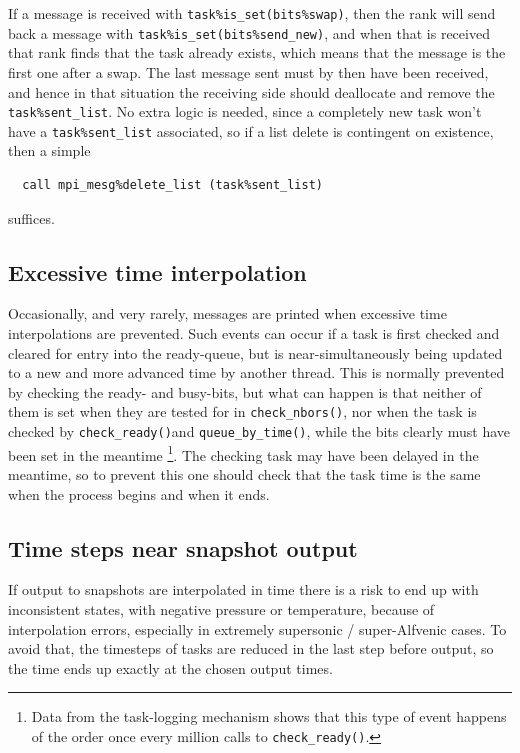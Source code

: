 \documentclass[paper=a4,fontsize=11pt]{scrartcl}
\numberwithin{equation}{section}		%
\numberwithin{figure}{section}			%
\numberwithin{table}{section}				%
\newcommand{\codecolor}{\color{Blue}}
\newcommand{\Code}[1]{{\codecolor\texttt{#1}}}
\def\checkready{\Code{check\_ready()}}
\def\checknbors{\Code{check\_nbors()}}
\def\queuebytime{\Code{queue\_by\_time()}}
\begin{document}
If a message is received with \Code{task\%is\_set(bits\%swap)}, then the rank will send back a message with \Code{task\%is\_set(bits\%send\_new)}, and when that is received that rank finds that the task already exists, which means that the message is the first one after a swap.  The last message sent must by then have been received, and hence in that situation the receiving side should deallocate and remove the \Code{task\%sent\_list}.  No extra logic is needed, since a completely new task won't have a \Code{task\%sent\_list} associated, so if a list delete is contingent on existence, then a simple 
{\codecolor\begin{verbatim}
  call mpi_mesg%delete_list (task%sent_list)
\end{verbatim}}
suffices.

\subsection{Excessive time interpolation}
Occasionally, and very rarely, messages are printed when excessive time interpolations are prevented.  Such events can occur if a task is first checked and cleared for entry into the ready-queue, but is near-simultaneously being updated to a new and more advanced time by another thread.  This is normally prevented by checking the ready- and busy-bits, but what can happen is that neither of them is set when they are tested for in \checknbors, nor when the task is checked by \checkready and \queuebytime{}, while the bits clearly must have been set in the meantime \footnote{Data from the task-logging mechanism shows that this type of event happens of the order once every million calls to \checkready.}.
The checking task may have been delayed in the meantime, so to prevent this one should check that the task time is the same when the process begins and when it ends.

\subsection{Time steps near snapshot output}
If output to snapshots are interpolated in time there is a risk to end up with inconsistent states, with negative pressure or temperature, because of interpolation errors, especially in extremely supersonic / super-Alfvenic cases.   To avoid that, the timesteps of tasks are reduced in the last step before output, so the time ends up exactly at the chosen output times.
\end{document}
